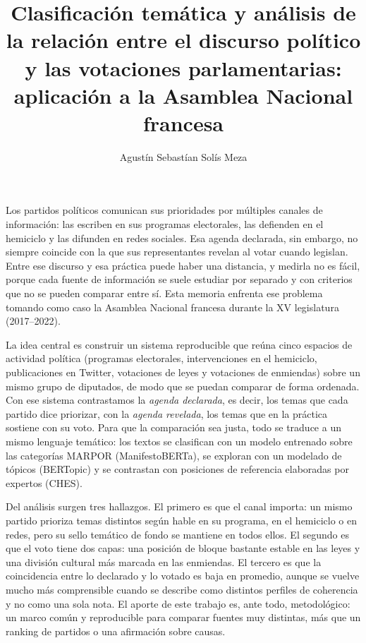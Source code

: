 \documentclass{umemoria}
\author{Agustín Sebastían Solís Meza}
\title{Clasificación temática y análisis de la relación entre el discurso político y las votaciones parlamentarias: aplicación a la Asamblea Nacional francesa}
\begin{document}
\frontmatter
\maketitle

\begin{resumen}
Los partidos políticos comunican sus prioridades por múltiples canales de
información: las escriben en sus programas electorales, las defienden en el
hemiciclo y las difunden en redes sociales. Esa agenda declarada, sin embargo, no
siempre coincide con la que sus representantes revelan al votar cuando legislan. Entre ese discurso y
esa práctica puede haber una distancia, y medirla no es fácil, porque cada fuente
de información se suele estudiar por separado y con criterios que no se pueden
comparar entre sí. Esta memoria enfrenta ese problema tomando como caso la
Asamblea Nacional francesa durante la XV legislatura (2017--2022).

La idea central es construir un sistema reproducible que reúna cinco espacios de
actividad política (programas electorales, intervenciones en el hemiciclo,
publicaciones en Twitter, votaciones de leyes y votaciones de enmiendas) sobre un
mismo grupo de diputados, de modo que se puedan comparar de forma ordenada. Con
ese sistema contrastamos la \emph{agenda declarada}, es decir, los temas que cada
partido dice priorizar, con la \emph{agenda revelada}, los temas que en la
práctica sostiene con su voto. Para que la comparación sea justa, todo se traduce
a un mismo lenguaje temático: los textos se clasifican con un modelo entrenado
sobre las categorías MARPOR (ManifestoBERTa), se exploran con un modelado de
tópicos (BERTopic) y se contrastan con posiciones de referencia elaboradas por
expertos (CHES).

Del análisis surgen tres hallazgos. El primero es que el canal importa: un mismo
partido prioriza temas distintos según hable en su programa, en el hemiciclo o en
redes, pero su sello temático de fondo se mantiene en todos ellos. El segundo es
que el voto tiene dos capas: una posición de bloque bastante estable en las leyes
y una división cultural más marcada en las enmiendas. El tercero es que la
coincidencia entre lo declarado y lo votado es baja en promedio, aunque se vuelve
mucho más comprensible cuando se describe como distintos perfiles de coherencia y
no como una sola nota. El aporte de este trabajo es, ante todo, metodológico: un
marco común y reproducible para comparar fuentes muy distintas, más que un ranking
de partidos o una afirmación sobre causas.
\end{resumen}
\end{document}
